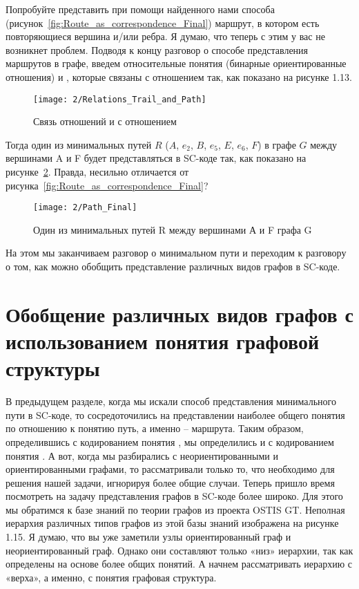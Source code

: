 Попробуйте представить при помощи найденного нами способа
(рисунок~\ref{fig:Route_as_correspondence_Final}) маршрут, в котором
есть повторяющиеся вершина и/или ребра. Я думаю, что теперь с этим у
вас не возникнет проблем. Подводя к концу разговор о способе
представления маршрутов в графе, введем относительные понятия
(бинарные ориентированные отношения)  и , которые
связаны с отношением  так, как показано на рисунке 1.13.

\begin{figure}[h!]
  \centering
  \texttt{[image: 2/Relations\_Trail\_and\_Path]}
  \caption{Связь отношений  и  с отношением
    }
  \label{fig:Relations_Trail_and_Path}
\end{figure}

Тогда один из минимальных путей $R$ ($A$, $e_2$, $B$, $e_5$, $E$,
$e_6$, $F$) в графе $G$ между вершинами A и F будет представляться в
SC-коде так, как показано на рисунке~\ref{fig:Path_Final}. Правда,
несильно отличается от
рисунка~\ref{fig:Route_as_correspondence_Final}?

\begin{figure}[h!]
  \centering
  \texttt{[image: 2/Path\_Final]}
  \caption{Один из минимальных путей R между вершинами А и F графа G}
  \label{fig:Path_Final}
\end{figure}
 
На этом мы заканчиваем разговор о минимальном пути и переходим к
разговору о том, как можно обобщить представление различных видов
графов в SC-коде.

\section{Обобщение различных видов графов с использованием понятия
  графовой структуры}

В предыдущем разделе, когда мы искали способ представления
минимального пути в SC-коде, то сосредоточились на представлении
наиболее общего понятия по отношению к понятию путь, а именно –
маршрута. Таким образом, определившись с кодированием понятия
, мы определились и с кодированием понятия . А
вот, когда мы разбирались с неориентированными и ориентированными
графами, то рассматривали только то, что необходимо для решения нашей
задачи, игнорируя более общие случаи. Теперь пришло время посмотреть
на задачу представления графов в SC-коде более широко. Для этого мы
обратимся к базе знаний по теории графов из проекта OSTIS GT. Неполная
иерархия различных типов графов из этой базы знаний изображена на
рисунке 1.15. Я думаю, что вы уже заметили узлы ориентированный граф и
неориентированный граф. Однако они составляют только «низ» иерархии,
так как определены на основе более общих понятий. А начнем
рассматривать иерархию с «верха», а именно, с понятия графовая
структура.

